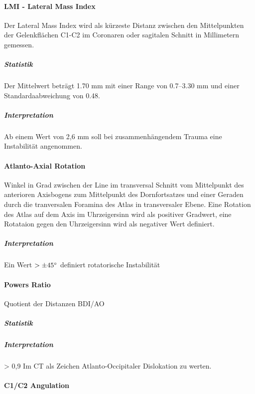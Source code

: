 \documentclass{report}
\begin{document}
\paragraph{LMI - Lateral Mass Index}

Der Lateral Mass Index wird als kürzeste Distanz zwischen den Mittelpunkten der Gelenkflächen C1-C2 im Coronaren oder sagitalen Schnitt in Millimetern gemessen. 
\subparagraph{Statistik}
Der Mittelwert beträgt 1.70 mm mit einer Range von 0.7–3.30 mm und einer Standardaabweichung von 0.48.
\subparagraph{Interpretation}
 Ab einem Wert von 2,6 mm soll bei zusammenhängendem Trauma eine Instabilität angenommen.

 


\paragraph{Atlanto-Axial Rotation} %
\label{par:c1_c2_rotation}
Winkel in Grad zwischen der Line im transversal Schnitt vom Mittelpunkt des anterioren Axisbogens zum Mittelpunkt des Dornfortsatzes und einer Geraden durch die tranversalen Foramina des Atlas in transversaler Ebene.
Eine Rotation des Atlas auf dem Axis im Uhrzeigersinn wird als positiver Gradwert, eine Rotataion gegen den Uhrzeigersinn wird als negativer Wert definiert.

\subparagraph{Interpretation}
 Ein Wert  $>\pm 45 \degree$ definiert rotatorische Instabilität
\paragraph{Powers Ratio} %
\label{par:powers_ratio}
Quotient der Distanzen BDI/AO

\subparagraph{Statistik}
\begin{tabular}

\end{tabular}
\subparagraph{Interpretation} %
\label{subp:}
> 0,9 Im CT als Zeichen Atlanto-Occipitaler Dislokation zu werten.


\paragraph{C1/C2 Angulation} %
\label{par:c1_c2_angulation}

\paragraph{}
\end{document}
